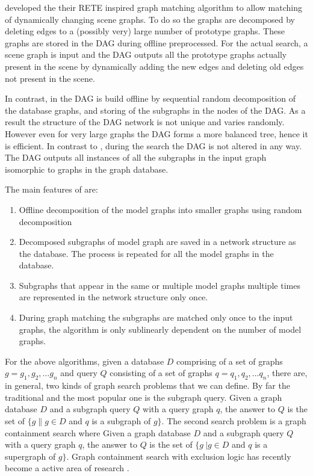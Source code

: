 \cite{bunke_glauser_tran1991} developed the their RETE inspired graph matching algorithm to allow matching of dynamically changing scene graphs. To do so the graphs are decomposed by deleting edges to a (possibly very) large number of prototype graphs. These graphs are stored in the DAG during offline preprocessed. For the actual search, a scene graph is input and the DAG outputs all the prototype graphs actually present in the scene by dynamically  adding the new edges and deleting old edges not present in the scene.

In contrast, in \cite{messmer_bunke2000} the DAG is build offline by sequential random decomposition of the database graphs, and storing of the subgraphs in the nodes of the DAG. As a result the structure of the DAG network is not unique and varies randomly. However even for very large graphs the DAG forms a more balanced tree, hence it is efficient. In contrast to \cite{bunke_glauser_tran1991}, during the search the DAG is not altered in any way. The DAG outputs all instances of all the subgraphs in the input graph isomorphic to graphs in the graph database.  

The main features of \cite{bunke_glauser_tran1991} are:

\begin{enumerate}
\item Offline decomposition of the model graphs into smaller graphs using  random decomposition
\item Decomposed subgraphs of model graph are saved in a network structure as the database. The process is repeated for all the model graphs in the database.
\item Subgraphs that appear in the same or multiple model graphs multiple times are represented in the network structure only once.
\item During graph matching the subgraphs are matched only once to the input graphs, the algorithm is only sublinearly dependent on the number of model graphs.
\end{enumerate}

For the above algorithms, given a database $D$ comprising of a set of graphs $g=g_1 ,g_2 ,\ldots g_n$ and query $Q$ consisting of a set of graphs 
$q=q_1 ,q_2 ,\ldots q_n$, there are, in general, two kinds of graph search problems that we can define. By far the traditional and the most popular 
one is the subgraph query. Given a graph database $D$ and a subgraph query $Q$ with  a query graph $q$, the answer to $Q$ is the set of $\{g \| g\in D$ 
and $q$ is a subgraph of $g\} $. The second search problem is a graph containment search where Given a graph database $D$ and a subgraph query $Q$ with  
a query graph $q$, the answer to $Q$ is the set of $\{g\ | g\in D$ and $q$ is a supergraph of $g\}$. Graph containment search with exclusion logic has 
recently become a  active area of research \cite{chen2007_cindex} \cite{zhang_gao_wu2011}.  
 

